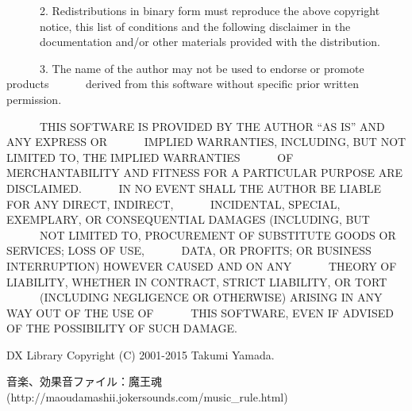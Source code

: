 　　　2. Redistributions in binary form must reproduce the above copyright
　　　notice, this list of conditions and the following disclaimer in the
　　　documentation and/or other materials provided with the distribution.

　　　3. The name of the author may not be used to endorse or promote products
　　　derived from this software without specific prior written permission.

　　　THIS SOFTWARE IS PROVIDED BY THE AUTHOR ``AS IS'' AND ANY EXPRESS OR
　　　IMPLIED WARRANTIES, INCLUDING, BUT NOT LIMITED TO, THE IMPLIED WARRANTIES
　　　OF MERCHANTABILITY AND FITNESS FOR A PARTICULAR PURPOSE ARE DISCLAIMED.
　　　IN NO EVENT SHALL THE AUTHOR BE LIABLE FOR ANY DIRECT, INDIRECT,
　　　INCIDENTAL, SPECIAL, EXEMPLARY, OR CONSEQUENTIAL DAMAGES (INCLUDING, BUT
　　　NOT LIMITED TO, PROCUREMENT OF SUBSTITUTE GOODS OR SERVICES; LOSS OF USE,
　　　DATA, OR PROFITS; OR BUSINESS INTERRUPTION) HOWEVER CAUSED AND ON ANY
　　　THEORY OF LIABILITY, WHETHER IN CONTRACT, STRICT LIABILITY, OR TORT
　　　(INCLUDING NEGLIGENCE OR OTHERWISE) ARISING IN ANY WAY OUT OF THE USE OF
　　　THIS SOFTWARE, EVEN IF ADVISED OF THE POSSIBILITY OF SUCH DAMAGE.

DX Library Copyright (C) 2001-2015 Takumi Yamada.



音楽、効果音ファイル：魔王魂(http://maoudamashii.jokersounds.com/music_rule.html)
